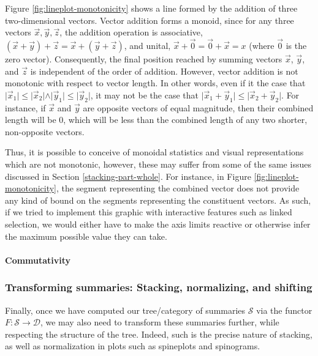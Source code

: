 \documentclass[
  openany]{book}
\theoremstyle{definition}
\theoremstyle{definition}
\theoremstyle{definition}
\theoremstyle{definition}
\theoremstyle{remark}
\begin{document}
Figure \ref{fig:lineplot-monotonicity} shows a line formed by the addition of three two-dimensional vectors. Vector addition forms a monoid, since for any three vectors \(\vec{x}, \vec{y}, \vec{z}\), the addition operation is associative, \((\vec{x} + \vec{y}) + \vec{z} = \vec{x} + (\vec{y} + \vec{z})\), and unital, \(\vec{x} + \vec{0} = \vec{0} + \vec{x} = x\) (where \(\vec{0}\) is the zero vector). Consequently, the final position reached by summing vectors \(\vec{x}\), \(\vec{y}\), and \(\vec{z}\) is independent of the order of addition. However, vector addition is not monotonic with respect to vector length. In other words, even if it the case that \(\lvert \vec{x}_1 \lvert \leq \lvert \vec{x}_2 \lvert \wedge \lvert \vec{y}_1 \lvert \leq \lvert \vec{y}_2 \lvert\), it may not be the case that \(\lvert \vec{x}_1 + \vec{y}_1 \lvert \leq \lvert \vec{x}_2 + \vec{y}_2 \lvert\). For instance, if \(\vec{x}\) and \(\vec{y}\) are opposite vectors of equal magnitude, then their combined length will be 0, which will be less than the combined length of any two shorter, non-opposite vectors.

Thus, it is possible to conceive of monoidal statistics and visual representations which are not monotonic, however, these may suffer from some of the same issues discussed in Section \ref{stacking-part-whole}. For instance, in Figure \ref{fig:lineplot-monotonicity}, the segment representing the combined vector does not provide any kind of bound on the segments representing the constituent vectors. As such, if we tried to implement this graphic with interactive features such as linked selection, we would either have to make the axis limits reactive or otherwise infer the maximum possible value they can take.

\paragraph{Commutativity}\label{commutativity}

\subsubsection{Transforming summaries: Stacking, normalizing, and shifting}\label{transforming-summaries}

Finally, once we have computed our tree/category of summaries \(\mathcal{S}\) via the functor \(F: \mathcal{S} \to \mathcal{D}\), we may also need to transform these summaries further, while respecting the structure of the tree. Indeed, such is the precise nature of stacking, as well as normalization in plots such as spineplots and spinograms.
\end{document}
